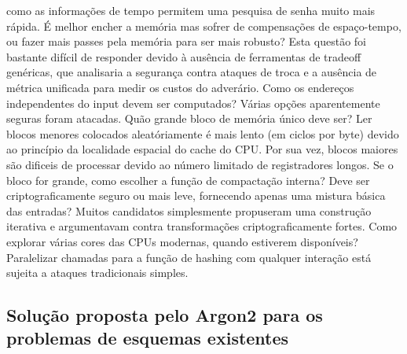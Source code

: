 \documentclass[conference]{IEEEtran}
\begin{document}
como as informações de tempo permitem uma pesquisa de senha muito mais rápida. 
É melhor encher a memória mas sofrer de compensações de espaço-tempo, ou fazer mais passes pela memória para ser mais robusto? 
Esta questão foi bastante difícil de responder devido à ausência de ferramentas de tradeoff genéricas, 
que analisaria a segurança contra ataques de troca e a ausência de métrica unificada para medir os custos do adverário.
Como os endereços independentes do input devem ser computados? Várias opções aparentemente seguras foram atacadas.
Quão grande bloco de memória único deve ser? Ler blocos menores colocados aleatóriamente é mais lento (em ciclos por byte) 
devido ao princípio da localidade espacial do cache do CPU. Por sua vez, 
blocos maiores são dificeis de processar devido ao número limitado de registradores longos. 
Se o bloco for grande, como escolher a função de compactação interna? Deve ser criptograficamente seguro ou mais leve, 
fornecendo apenas uma mistura básica das entradas? Muitos candidatos simplesmente propuseram uma construção iterativa e 
argumentavam contra transformações criptograficamente fortes. 
Como explorar várias cores das CPUs modernas, quando estiverem disponíveis? 
Paralelizar chamadas para a função de hashing com qualquer interação está sujeita a ataques tradicionais simples. \cite{rfc9106}

\subsection{Solução proposta pelo Argon2 para os problemas de esquemas existentes}
\end{document}
